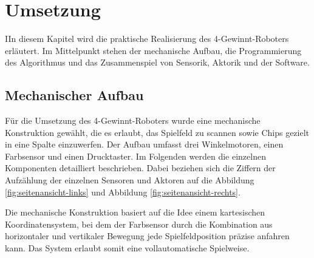 \chapter{ Umsetzung}
\label{cha:Umsetzung}
IIn diesem Kapitel wird die praktische Realisierung des 4-Gewinnt-Roboters erläutert. Im Mittelpunkt stehen der mechanische Aufbau, die Programmierung des Algorithmus und das Zusammenspiel von Sensorik, Aktorik und der Software.


\section{Mechanischer Aufbau}
Für die Umsetzung des 4-Gewinnt-Roboters wurde eine mechanische Konstruktion gewählt, die es erlaubt, das Spielfeld zu scannen sowie Chips gezielt in eine Spalte einzuwerfen. Der Aufbau umfasst drei Winkelmotoren, einen Farbsensor und einen Drucktaster. Im Folgenden werden die einzelnen Komponenten detailliert beschrieben. Dabei beziehen sich die Ziffern der Aufzählung der einzelnen Sensoren und Aktoren auf die Abbildung \ref{fig:seitenansicht-links} und Abbildung \ref{fig:seitenansicht-rechts}.

Die mechanische Konstruktion basiert auf die Idee einem kartesischen Koordinatensystem, bei dem der Farbsensor durch die Kombination aus horizontaler und vertikaler Bewegung jede Spielfeldposition präzise anfahren kann. Das System erlaubt somit eine vollautomatische Spielweise.

